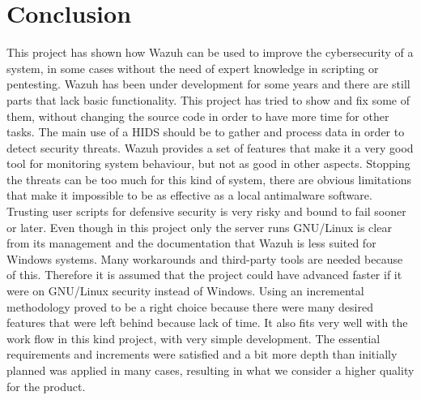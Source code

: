 \section{Conclusion}
This project has shown how Wazuh can be used to improve the cybersecurity of a system, in some cases without the need of expert knowledge in scripting or pentesting.
\linej
Wazuh has been under development for some years and there are still parts that lack basic functionality.
This project has tried to show and fix some of them, without changing the source code in order to have more time for other tasks.
\linej
\linej
The main use of a HIDS should be to gather and process data in order to detect security threats.
Wazuh provides a set of features that make it a very good tool for monitoring system behaviour, but not as good in other aspects.
\linej
Stopping the threats can be too much for this kind of system, there are obvious limitations that make it impossible to be as effective as a local antimalware software.
Trusting user scripts for defensive security is very risky and bound to fail sooner or later.
\linej
\linej
Even though in this project only the server runs GNU/Linux is clear from its management and the documentation that Wazuh is less suited for Windows systems.
Many workarounds and third-party tools are needed because of this.
Therefore it is assumed that the project could have advanced faster if it were on GNU/Linux security instead of Windows.
\linej
\linej
Using an incremental methodology proved to be a right choice because there were many desired features that were left behind because lack of time.
It also fits very well with the work flow in this kind project, with very simple development.
The essential requirements and increments were satisfied and a bit more depth than initially planned was applied in many cases, resulting in what we consider a higher quality for the product.

